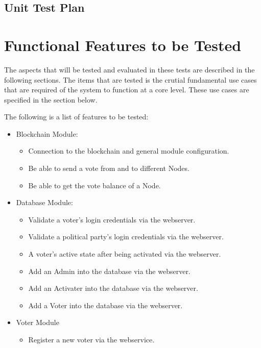 \documentclass[11pt]{article}
\begin{document}
	\begin{center}
		\section*{Unit Test Plan}
	\end{center}
	
	\section{Functional Features to be Tested}
	\label{sec:FunctionalFeaturesToBeTested}
	The aspects that will be tested and evaluated in these tests are described in the following sections. The items that are tested is the crutial fundamental use cases that are required of the system to function at a core level. These use cases are specified in the section below.\newline
	
	The following is a list of features to be tested:
	\begin{itemize}
		\item Blockchain Module:
		\begin{itemize}
			\item Connection to the blockchain and general module configuration.
			\item Be able to send a vote from and to different Nodes.
			\item Be able to get the vote balance of a Node.
		\end{itemize}
		\item{Database Module:}
		\begin{itemize}
			\item Validate a voter's login credentials via the webserver.
			\item Validate a political party's login credentials via the webserver.
			\item A voter's active state after being activated via the webserver.
			\item Add an Admin into the database via the webserver.
			\item Add an Activater into the database via the webserver.
			\item Add a Voter into the database via the webserver.
		\end{itemize}
		\item{Voter Module}
		\begin{itemize}
			\item Register a new voter via the webservice.
		\end{itemize}
	\end{itemize}
	
\end{document}
